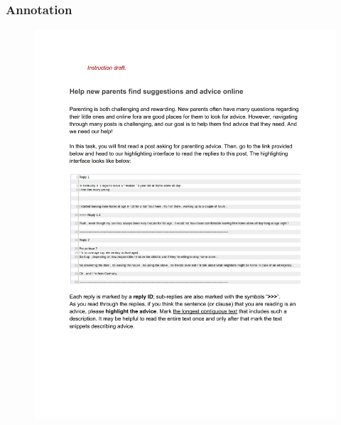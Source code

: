 \begin{frame}[c]\frametitle{Annotation}
    \begin{figure}
        \centering
        \includegraphics[width=\linewidth]{figures/ann-1.pdf}
        \caption{}
    \end{figure}
\end{frame}

